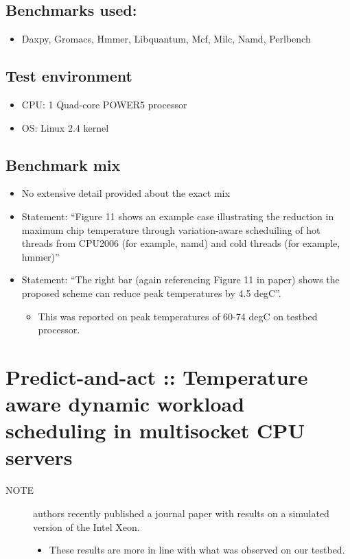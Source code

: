 \documentclass[11pt]{article}
\begin{document}
\subsection{Benchmarks used:}
\label{sec-3-2}

\begin{itemize}
\item Daxpy, Gromacs, Hmmer, Libquantum, Mcf, Milc, Namd, Perlbench
\end{itemize}
\subsection{Test environment}
\label{sec-3-3}

\begin{itemize}
\item CPU: 1 Quad-core POWER5 processor
\item OS: Linux 2.4 kernel
\end{itemize}
\subsection{Benchmark mix}
\label{sec-3-4}

\begin{itemize}
\item No extensive detail provided about the exact mix
\item Statement: ``Figure 11 shows an example case illustrating the
     reduction in maximum chip temperature through variation-aware
     scheduiling of hot threads from CPU2006 (for example, namd) and
     cold threads (for example, hmmer)''
\item Statement: ``The right bar (again referencing Figure 11 in paper)
     shows the proposed scheme can reduce peak temperatures by 4.5
     degC''.
\begin{itemize}
\item This was reported on peak temperatures of 60-74 degC on testbed
       processor.
\end{itemize}
\end{itemize}
\section{Predict-and-act :: Temperature aware dynamic workload scheduling in multisocket CPU servers}
\label{sec-4}

\begin{description}
\item[NOTE] authors recently published a journal paper with 
            results on a simulated version of the Intel Xeon.
\begin{itemize}
\item These results are more in line with what was observed on
              our testbed.
\end{itemize}
\end{description}
\end{document}
